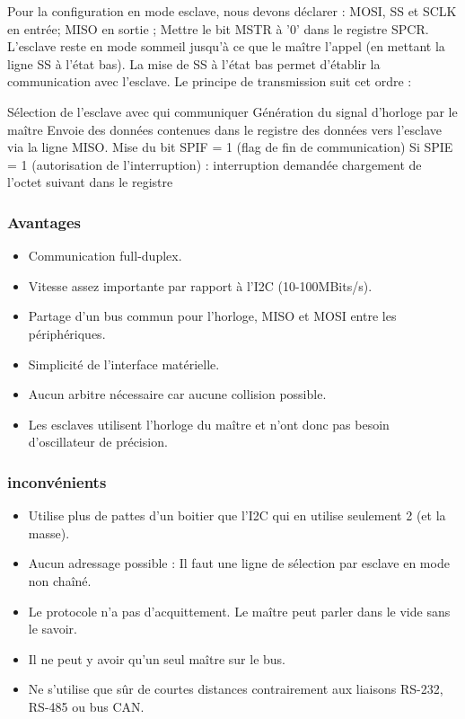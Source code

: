 \documentclass[french,a4paper,12pt]{report}
\begin{document}
  		Pour la configuration en mode esclave, nous devons déclarer : MOSI, SS et SCLK en entrée; MISO en sortie ; Mettre le bit MSTR à '0' dans le registre SPCR. L’esclave reste en mode sommeil jusqu’à ce que le maître l'appel (en mettant la ligne SS à l’état bas). La mise de SS à l’état bas permet d'établir la communication avec l’esclave. Le principe de transmission suit cet ordre :
 
    Sélection de l'esclave avec qui communiquer
    Génération du signal d'horloge par le maître
    Envoie des données contenues dans le registre des données vers l’esclave via la ligne MISO.
    Mise du bit SPIF = 1 (flag de fin de communication)
    Si SPIE = 1 (autorisation de l’interruption) :
        interruption demandée
        chargement de l’octet suivant dans le registre

			\subsubsection{Avantages}
 
			\begin{itemize}
			\item Communication full-duplex.
			\item Vitesse assez importante par rapport à l’I2C (10-100MBits/s).
			\item Partage d’un bus commun pour l’horloge, MISO et MOSI entre les périphériques.
			\item Simplicité de l’interface matérielle.
			\item Aucun arbitre nécessaire car aucune collision possible.
			\item Les esclaves utilisent l’horloge du maître et n’ont donc pas besoin d’oscillateur de précision.
			\end{itemize}
 
  		\subsubsection{inconvénients}
 
			\begin{itemize}
			\item Utilise plus de pattes d’un boitier que l’I2C qui en utilise seulement 2 (et la masse).
			\item Aucun adressage possible : Il faut une ligne de sélection par esclave en mode non chaîné.
			\item Le protocole n’a pas d’acquittement. Le maître peut parler dans le vide sans le savoir.
			\item Il ne peut y avoir qu’un seul maître sur le bus.
			\item Ne s’utilise que sûr de courtes distances contrairement aux liaisons RS-232, RS-485 ou bus CAN.
			\end{itemize}
 
\end{document}
